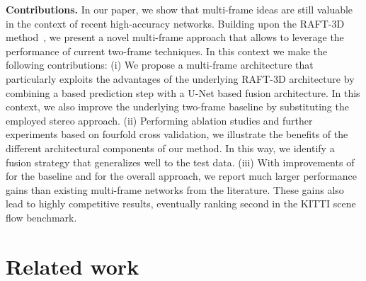 \documentclass[10pt,twocolumn,letterpaper]{article}
\newcommand{\skipping}[1]{}
\begin{document}
\skipping{
In this context, Maurer and Bruhn 
\cite{Maurer2018_ProFlow} showed recently in the field of optical flow estimation that so called {\em online prediction models} can be a valuable tool not only to exploit temporal information 
but also to exploit information from the actual image sequence at 
{\em run time}. The basic idea of such models is to train an individual small prediction network at run time {\em on the fly for each frame of each sequence} to forecast forward from backward flow, and, based on this prediction, to replace estimates at previously identified unreliable locations, \eg at occlusions. 
Not surprisingly, such a strategy has shown good generalization capabilities across different scenarios due to its inherent adaptivity by training the network on the actual data under consideration \cite{RVC2018}. Furthermore, the prediction network can be used in addition to any baseline method and it is simple to train, since the architecture is comparably lightweight.
}










\medskip
\noindent
\textbf{Contributions.}
In our paper, we show that multi-frame ideas are still valuable in the context of recent high-accuracy networks.
Building upon the RAFT-3D method~\cite{Teed2021_RAFT3D}, we present a novel multi-frame approach that allows to leverage the performance of current two-frame techniques.
In this context we make the following contributions:
(i) We propose a multi-frame architecture that particularly exploits the advantages of the underlying RAFT-3D architecture by combining a  based prediction step with a U-Net based fusion architecture. In this context, we also improve the underlying two-frame baseline by substituting the employed stereo approach.
(ii) Performing ablation studies and further experiments based on fourfold cross validation, we illustrate the benefits of the different architectural components of our method. In this way, we identify a fusion strategy that generalizes well to the test data.
(iii) With improvements of  for the baseline and  for the overall approach, we report much larger performance gains than existing multi-frame networks from the literature. These gains also lead to highly competitive results, eventually ranking second in the KITTI scene flow benchmark.



\section{Related work}
\end{document}
